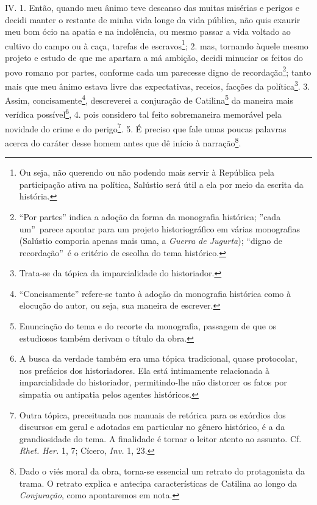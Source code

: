 IV. 1. Então, quando meu ânimo teve descanso das muitas misérias e perigos e
decidi manter o restante de minha vida longe da vida pública, não quis exaurir
meu bom ócio na apatia e na indolência, ou mesmo passar a vida voltado ao
cultivo do campo ou à caça, tarefas de escravos\footnote{Ou seja, não querendo
ou não podendo mais servir à República pela participação ativa na política,
Salústio será útil a ela por meio da escrita da história.}; 2. mas, tornando
àquele mesmo projeto e estudo de que me apartara a má ambição, decidi minuciar
os feitos do povo romano por partes, conforme cada um parecesse digno de
recordação\footnote{``Por partes'' indica a adoção da forma da monografia
histórica; ''cada um''\ parece apontar para um projeto historiográfico em
várias monografias (Salústio comporia apenas mais uma, a \emph{Guerra de
Jugurta}); ``digno de recordação''\ é o critério de escolha do tema
histórico.}; tanto mais que meu ânimo estava livre das expectativas, receios,
facções da política\footnote{Trata-se da tópica da imparcialidade do
historiador.}. 3. Assim, concisamente\footnote{``Concisamente'' refere-se tanto
à adoção da monografia histórica como à elocução do autor, ou seja, sua maneira
de escrever.}, descreverei a conjuração de Catilina\footnote{Enunciação do tema
e do recorte da monografia, passagem de que os estudiosos também derivam o
título da obra.} da maneira mais verídica possível\footnote{A  busca da verdade
também era uma tópica tradicional, quase protocolar, nos prefácios dos
historiadores. Ela está intimamente relacionada à imparcialidade do
historiador, permitindo-lhe não distorcer os fatos por simpatia ou antipatia
pelos agentes históricos.}, 4. pois considero tal feito sobremaneira memorável
pela novidade do crime e do perigo\footnote{Outra tópica, preceituada nos
manuais de retórica para os exórdios dos discursos em geral e adotadas em
particular no gênero histórico, é a da grandiosidade do tema. A finalidade é
tornar o leitor atento ao assunto. Cf. \emph{Rhet. Her.} 1, 7; Cícero, \emph{Inv.} 1, 23.}. 5. É preciso que fale umas poucas
palavras acerca do caráter desse homem antes que dê início à
narração\footnote{Dado o viés moral da obra, torna-se essencial um retrato do
protagonista da trama. O retrato explica e antecipa características de Catilina
ao longo da \emph{Conjuração}, como apontaremos em nota.}.

